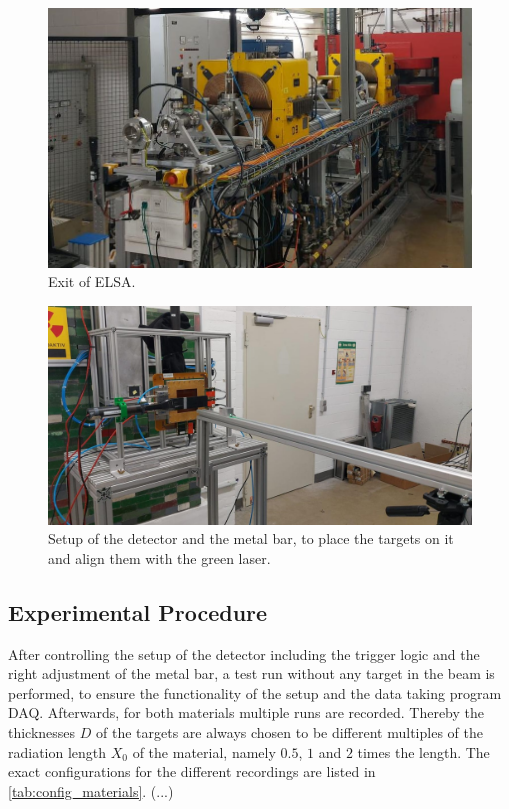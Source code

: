 \documentclass[sn-mathphys-num,iicol]{sn-jnl}
\theoremstyle{thmstyleone}
\theoremstyle{thmstyletwo}
\theoremstyle{thmstylethree}
\begin{document}
\begin{figure}
  \includegraphics[width=\linewidth]{figures/beam_setup_elsa.jpg}
  \caption{Exit of ELSA.}
  \label{fig:beam_setup_elsa}
\end{figure}

\begin{figure}
  \includegraphics[width=\linewidth]{figures/detector_setup_elsa.jpg}
  \caption{Setup of the detector and the metal bar, to place the targets on it and align them with the green laser.}
  \label{fig:detector_setup_elsa}
\end{figure}

\subsection{Experimental Procedure}
After controlling the setup of the detector including the trigger logic and the right adjustment of the metal bar, a test run without any target in the beam is performed, to ensure the functionality of the setup and the data taking program DAQ.
Afterwards, for both materials multiple runs are recorded. Thereby the thicknesses $D$ of the targets are always chosen to be different multiples of the radiation length $X_0$ of the material, namely $0.5$, $1$ and $2$ times the length. The exact configurations for the different recordings are listed in \autoref{tab:config_materials}.
(...)
\end{document}
